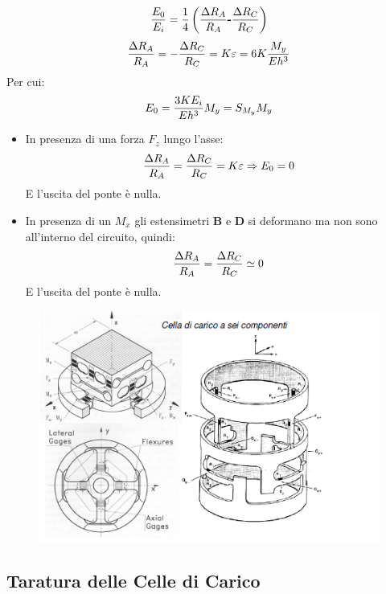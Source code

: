 \documentclass[a4paper, 15pt]{article}
\begin{document}
\begin{adjustwidth}{2in}{}
\begin{figure}[H]
  			\label{fig:screenshot011}
  		\end{figure} 	 		
  		\[{E_0\over E_i} = {1\over4}\left({\Delta R_A\over R_A} \textbf{-} {\Delta R_C\over R_C}\right)\]  		
  		\[{\Delta R_A\over R_A} = -{\Delta R_C\over R_C} = K\varepsilon = 6K{M_y\over Eh^3}\]
  		Per cui:
  		\[E_0 = {3KE_i\over Eh^3}M_y = S_{M_y}M_y \]		
  		\begin{itemize}
  			\item In presenza di una forza $F_z$ lungo l'asse: \[{\Delta R_A\over R_A} = {\Delta R_C\over R_C} = K\varepsilon \Rightarrow E_0 = 0\] E l'uscita del ponte è nulla.
  			\item In presenza di un $M_x$ gli estensimetri \textbf{B} e \textbf{D} si deformano ma non sono all'interno del circuito, quindi:
  			\[{\Delta R_A\over R_A} = {\Delta R_C\over R_C}\simeq0\]
  			E l'uscita del ponte è nulla. 
  		\end{itemize}  		
  		\begin{figure}[H]
  			\centering
  			\includegraphics[width=0.5\linewidth]{immagini/screenshot012}
  			\label{fig:screenshot012}
  		\end{figure}
\end{adjustwidth}
\newpage
\subsection{Taratura delle Celle di Carico}	
\end{document}
